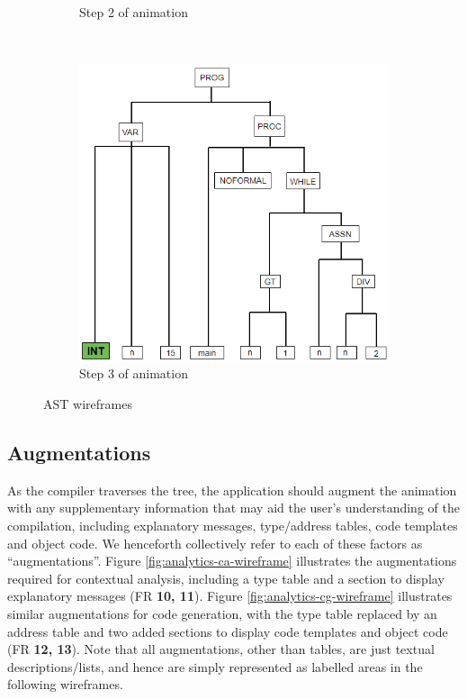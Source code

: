 \documentclass{l4proj}
\begin{document}
\begin{figure}[h]
\begin{subfigure}[b]{0.3\textwidth}
		\caption{Step 2 of animation}
		\label{fig:anim-step-2}
	\end{subfigure}	
	~
	\begin{subfigure}[b]{0.3\textwidth}
		\includegraphics[width=\linewidth]{images/animation-active-wireframe3.png}
		\caption{Step 3 of animation}
		\label{fig:anim-step-3}
	\end{subfigure}	
	\caption{AST wireframes}
	\label{fig:animation-active-wireframe}	
\end{figure}

\subsection{Augmentations}
As the compiler traverses the tree, the application should augment the animation with any supplementary information that may aid the user's understanding of the compilation, including explanatory messages, type/address tables, code templates and object code. We henceforth collectively refer to each of these factors as ``augmentations''. Figure \ref{fig:analytics-ca-wireframe} illustrates the augmentations required for contextual analysis, including a type table and a section to display explanatory messages (FR \textbf{10, 11}). Figure \ref{fig:analytics-cg-wireframe} illustrates similar augmentations for code generation, with the type table replaced by an address table and two added sections to display code templates and object code (FR \textbf{12, 13}). Note that all augmentations, other than tables, are just textual descriptions/lists, and hence are simply represented as labelled areas in the following wireframes.
\end{document}
